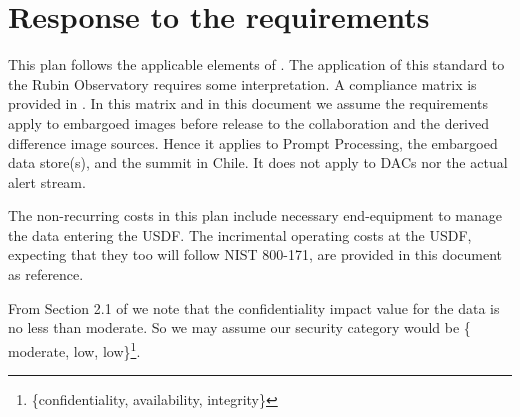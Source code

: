 \section{Response to the requirements}\label{sec:resp}

This plan follows the applicable elements of . The application of this standard to the Rubin Observatory requires some interpretation. A compliance matrix is provided in .
In this matrix and in this document we assume the requirements apply to embargoed images before release to the collaboration and the derived difference image sources.
Hence it applies to Prompt Processing, the embargoed data store(s), and the summit in Chile. It does not apply to DACs nor the actual alert stream.

The non-recurring costs in this plan include necessary end-equipment to manage the data entering the USDF. The incrimental operating costs at the USDF, expecting that they too will follow NIST 800-171, are provided in this document as reference.

From Section 2.1 of  we note that the confidentiality impact value for the data  is no less than moderate.
So we may assume our  security category would be \{ moderate, low, low\}\footnote{\{confidentiality, availability, integrity\}}.









